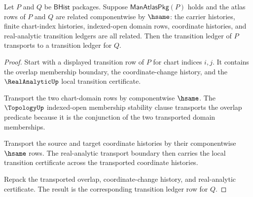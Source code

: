 \begin{theorem}
\label{thm:manifoldup-transition-ledger-stability}
Let $P$ and $Q$ be $\mathsf{BHist}$ packages. Suppose
$\mathsf{ManAtlasPkg}(P)$ holds and the atlas rows of $P$ and $Q$ are related
componentwise by $\hsame$: the carrier histories, finite chart-index histories,
indexed-open domain rows, coordinate histories, and real-analytic transition
ledgers are all related. Then the transition ledger of $P$ transports to a
transition ledger for $Q$.
\end{theorem}
\begin{proof}
Start with a displayed transition row of $P$ for chart indices $i,j$. It
contains the overlap membership boundary, the coordinate-change history, and
the $\RealAnalyticUp$ local transition certificate.

Transport the two chart-domain rows by componentwise $\hsame$. The
$\TopologyUp$ indexed-open membership stability clause transports the overlap
predicate because it is the conjunction of the two transported domain
memberships.

Transport the source and target coordinate histories by their componentwise
$\hsame$ rows. The real-analytic transport boundary then carries the local
transition certificate across the transported coordinate histories.

Repack the transported overlap, coordinate-change history, and real-analytic
certificate. The result is the corresponding transition ledger row for $Q$.
\end{proof}

